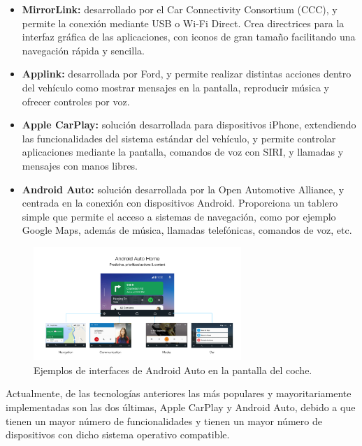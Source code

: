 \documentclass[12pt]{report} %
\begin{document}
\begin{itemize}

    \item \textbf{MirrorLink:} desarrollado por el Car Connectivity Consortium (CCC), y permite la conexión mediante USB o Wi-Fi Direct. Crea directrices para la interfaz gráfica de las aplicaciones, con iconos de gran tamaño facilitando una navegación rápida y sencilla.
    \item \textbf{Applink:} desarrollada por Ford, y permite realizar distintas acciones dentro del vehículo como mostrar mensajes en la pantalla, reproducir música y ofrecer controles por voz.
    \item \textbf{Apple CarPlay:} solución desarrollada para dispositivos iPhone, extendiendo las funcionalidades del sistema estándar del vehículo, y permite controlar aplicaciones mediante la pantalla, comandos de voz con SIRI, y llamadas y mensajes con manos libres.
    \item \textbf{Android Auto:} solución desarrollada por la Open Automotive Alliance, y centrada en la conexión con dispositivos Android. Proporciona un tablero simple que permite el acceso a sistemas de navegación, como por ejemplo Google Maps, además de música, llamadas telefónicas, comandos de voz, etc.

\end{itemize}

\begin{figure}[h]
	\centering
	\includegraphics[width=0.7\textwidth]{androidAuto.png}
	\caption{Ejemplos de interfaces de Android Auto en la pantalla del coche.}
	\label{fig:imagen5}
\end{figure}

Actualmente, de las tecnologías anteriores las más populares y mayoritariamente implementadas  son las dos últimas,  Apple CarPlay y Android Auto, debido a que tienen un mayor número de funcionalidades y tienen un mayor número de dispositivos con dicho sistema operativo compatible.
\end{document}
